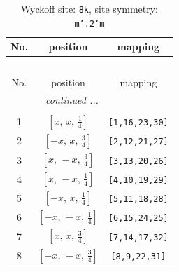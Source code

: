 \documentclass[fleqn,8pt]{jsarticle}
\begin{document}
\begin{longtable}{ccc}
\caption{Wyckoff site: {\tt 8k}, site symmetry: {\tt m'.2'm}}
 \\
 \hline \hline
No. & position & mapping \\ \hline \endfirsthead

\multicolumn{2}{l}{\tablename\ \thetable{}} \\
 \hline \hline
No. & position & mapping \\ \hline \endhead

 \hline \hline
\multicolumn{2}{r}{\footnotesize\it continued ...} \\ \endfoot

 \hline \hline
\multicolumn{2}{r}{} \\ \endlastfoot

1 & $\left[ x,\, x,\, \frac{1}{4} \right]$ & {\tt [1,16,23,30]} \\ \hline
2 & $\left[ - x,\, x,\, \frac{3}{4} \right]$ & {\tt [2,12,21,27]} \\ \hline
3 & $\left[ x,\, - x,\, \frac{3}{4} \right]$ & {\tt [3,13,20,26]} \\ \hline
4 & $\left[ x,\, - x,\, \frac{1}{4} \right]$ & {\tt [4,10,19,29]} \\ \hline
5 & $\left[ - x,\, x,\, \frac{1}{4} \right]$ & {\tt [5,11,18,28]} \\ \hline
6 & $\left[ - x,\, - x,\, \frac{1}{4} \right]$ & {\tt [6,15,24,25]} \\ \hline
7 & $\left[ x,\, x,\, \frac{3}{4} \right]$ & {\tt [7,14,17,32]} \\ \hline
8 & $\left[ - x,\, - x,\, \frac{3}{4} \right]$ & {\tt [8,9,22,31]} \\
\end{longtable}
\renewcommand{\arraystretch}{1.2}
\end{document}
